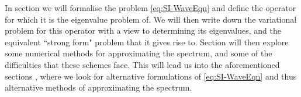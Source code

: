 In section  we will formalise the problem \eqref{eq:SI-WaveEqn} and define the operator for which it is the eigenvalue problem of.
We will then write down the variational problem for this operator with a view to determining its eigenvalues, and the equivalent ``strong form" problem that it gives rise to.
Section  will then explore some numerical methods for approximating the spectrum, and some of the difficulties that these schemes face.
This will lead us into the aforementioned sections , where we look for alternative formulations of \eqref{eq:SI-WaveEqn} and thus alternative methods of approximating the spectrum.